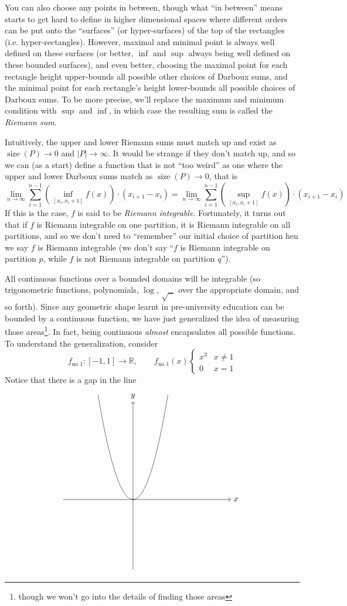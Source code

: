 \documentclass[oneside]{book}
\newcommand{\R}{\mathbb{R}}
\newcommand{\rw}{\rightarrow}
\begin{document}
You can also choose any points in between, though what ``in between'' means starts to get hard to define in higher
dimensional spaces where different orders can be put onto the ``surfaces'' (or hyper-surfaces) of the top of the
rectangles (i.e.  hyper-rectangles). However, maximal and minimal point is always well defined on these surfaces (or
better, $\inf$ and $\sup$ always being well defined on these bounded surfaces), and even better, choosing the maximal
point for each rectangle height upper-bounds all possible other choices of Darboux sums, and the minimal point for each
rectangle's height lower-bounds all possible choices of Darboux sums. To be more precise, we'll replace the maximum and
minimum condition with $\sup$ and $\inf$, in which case the resulting sum is called the \emph{Riemann sum}.

Intuitively, the upper and lower Riemann sums must match up and exist as $\operatorname{size}(P) \rw 0$ and $|P| \rw
\infty$. It would be strange if they don't match up, and so we can (as a start) define a function that is not ``too
weird'' as one where the upper and lower Darboux sums match as $\operatorname{size}(P) \rw 0$, that is
\[
	\lim_{n \rw \infty}\sum_{i=1}^{n-1} \left(\inf_{[x_i, x_i+1]}f(x)\right) \cdot \left(x_{i+1} - x_i\right) = \lim_{n
	\rw \infty}\sum_{i=1}^{n-1} \left(\sup_{[x_i, x_i+1]}f(x)\right) \cdot \left(x_{i+1} - x_i\right)
\]
If this is the case, $f$ is said to be \emph{Riemann integrable}. Fortunately, it turns out that if $f$ is Riemann
integrable on one partition, it is Riemann integrable on all partitions, and so we don't need to ``remember'' our initial
choice of partition hen we say $f$ is Riemann integrable (we don't say ``$f$ is Riemann integrable on partition $p$, while
$f$ is not Riemann integrable on partition $q$''). 


All continuous functions over a bounded domains will be integrable (so trigonometric functions, polynomials, $\log$,
$\sqrt{\_\_}$ over the appropriate domain, and so forth). Since any geometric shape learnt in pre-university education
can be bounded by a continuous function, we have just generalized the idea of measuring those areas\footnote{though we
won't go into the details of finding those areas}. In fact, being continuous \emph{almost} encapsulates all possible
functions. To understand the generalization, consider 
\[
	f_{\text{no }1}: [-1,1] \rw \R, \qquad f_{\text{no }1}(x) \begin{cases}
						x^3 & x \ne 1\\
						0 & x = 1
					\end{cases}
\]
Notice that there is a gap in the line
\[
	\begin{tikzpicture}
	  \draw[->] (-3, 0) -- (4.2, 0) node[right] {$x$};
	  \draw[->] (0, -3) -- (0, 4.2) node[above] {$y$};
	  \draw[scale=0.5, domain=-3:3, smooth, variable=\x] plot ({\x}, {\x*\x});
	  \node[circle,draw, scale=0.1] (c) at (0,0){};
	\end{tikzpicture}
\]
\end{document}
